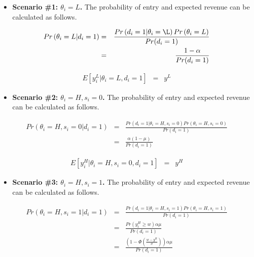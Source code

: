 \documentclass[letterpaper,12pt]{article}
\begin{document}
\begin{itemize}
\item \textbf{Scenario \#1: $\theta_{i}=L$.} The probability of entry and expected revenue can be calculated as follows.
\end{itemize}
\begin{eqnarray}
Pr\left(\theta_{i}=L\vert d_{i}=1\right) &=& \frac{Pr\left(d_{i}=1\vert \theta_{i}=\L\right)Pr\left(\theta_{i}=L\right)}{Pr(d_{i}=1)} \\
&=& \frac{1-\alpha}{Pr(d_{i}=1)}
\end{eqnarray}

\begin{eqnarray}
E\left[y^{L}_{i}\vert \theta_{i}=L,d_{i}=1\right] &=& y^{L}
\end{eqnarray}


\begin{itemize}
\item \textbf{Scenario \#2: $\theta_{i}=H, s_{i}=0$.} The probability of entry and expected revenue can be calculated as follows.
\end{itemize}
\begin{eqnarray}
Pr\left(\theta_{i}=H,s_{i}=0\vert d_{i}=1\right) &=& \frac{Pr\left(d_{i}=1\vert \theta_{i}=H,s_{i}=0\right)Pr\left(\theta_{i}=H,s_{i}=0\right)}{Pr(d_{i}=1)} \\
&=& \frac{\alpha(1-\mu)}{Pr(d_{i}=1)}
\end{eqnarray}

\begin{eqnarray}
E\left[y^{H}_{i}\vert \theta_{i}=H,s_{i}=0,d_{i}=1\right] &=& y^{H}
\end{eqnarray}




\begin{itemize}
\item \textbf{Scenario \#3: $\theta_{i}=H, s_{i}=1$.} The probability of entry and expected revenue can be calculated as follows.
\end{itemize}
\begin{eqnarray}
Pr\left(\theta_{i}=H,s_{i}=1\vert d_{i}=1\right) &=& \frac{Pr\left(d_{i}=1\vert \theta_{i}=H,s_{i}=1\right)Pr\left(\theta_{i}=H,s_{i}=1\right)}{Pr(d_{i}=1)} \\
&=& \frac{Pr\left(y^{H}_{i}\geq w\right)\alpha\mu}{Pr(d_{i}=1)} \\
&=& \frac{\left(1-\Phi\left(\frac{w-y^{H}}{\sigma}\right)\right)\alpha\mu}{Pr(d_{i}=1)}
\end{eqnarray}
\end{document}
